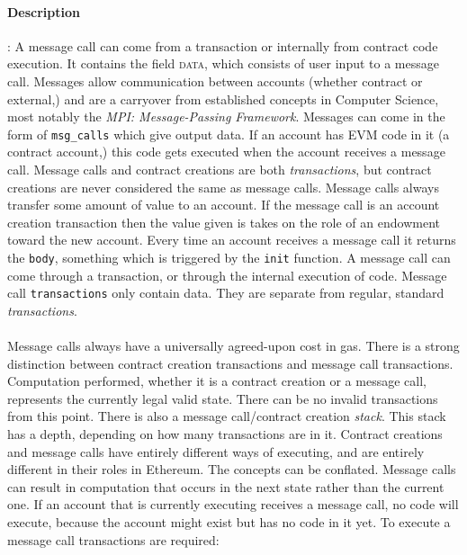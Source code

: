 \documentclass[10pt,a4paper,leqno,bibliography=totoc]{scrartcl}
\newenvironment{alphafootnotes}
{\par\edef\savedfootnotenumber{\number\value{footnote}}
\renewcommand{\thefootnote}{\alph{footnote}}
\setcounter{footnote}{0}}
{\par\setcounter{footnote}{\savedfootnotenumber}}
\begin{document}
\begin{alphafootnotes}
\begin{multicols*}{2}
\paragraph{Description}: A message call can come from a transaction or internally from contract code execution. It contains the field \textsc{data}, which consists of user input to a message call.
 Messages allow communication between accounts (whether contract or external,) and are a carryover from established concepts in Computer Science, most notably the \textsl{MPI: Message-Passing Framework}. Messages can come in the form of \texttt{msg\_calls} which give output data. If an account has EVM code in it (a contract account,) this code gets executed when the account receives a message call. Message calls and contract creations are both \textsl{transactions}, but contract creations are never considered the same as message calls. Message calls always transfer some amount of value to an account. If the message call is an account creation transaction then the value given is takes on the role of an endowment toward the new account. Every time an account receives a message call it returns the \texttt{body}, something which is triggered by the \texttt{init} function. A message call can come through a transaction, or through the internal execution of code. Message call \texttt{transactions} only contain data. They are separate from regular, standard \textit{transactions}.

\paragraph{}Message calls always have a universally agreed-upon cost in gas. There is a strong distinction between contract creation transactions and message call transactions. Computation performed, whether it is a contract creation or a message call, represents the currently legal valid state. There can be no invalid transactions from this point. \supercite{Wood2017} There is also a message call/contract creation \textit{stack}. This stack has a depth, depending on how many transactions are in it. Contract creations and message calls have entirely different ways of executing, and are entirely different in their roles in Ethereum. The concepts can be conflated. Message calls can result in computation that occurs in the next state rather than the current one. If an account that is currently executing receives a message call, no code will execute, because the account might exist but has no code in it yet. To execute a message call transactions are required:


\end{multicols*}
\end{alphafootnotes}
\end{document}
